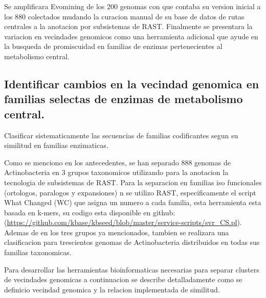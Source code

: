 \documentclass[12pt,twoside]{reedthesis}
\begin{document}
  Se amplificara Evomining de los 200 genomas con que contaba su version
  inicial a los 880 colectados mudando la curacion manual de su base de
  datos de rutas centrales a la anotacion por subsistemas de RAST.
  Finalmente se presentara la variacion en vecindades genomicos como una
  herramienta adicional que ayude en la busqueda de promiscuidad en
  familias de enzimas pertenecientes al metabolismo central.
  
  \subsection{Identificar cambios en la vecindad genomica en familias
  selectas de enzimas de metabolismo
  central.}\label{identificar-cambios-en-la-vecindad-genomica-en-familias-selectas-de-enzimas-de-metabolismo-central.-1}
  
  Clasificar sistematicamente las secuencias de familias codificantes
  segun su similitud en familias enzimaticas.
  
  Como se menciono en los antecedentes, se han separado 888 genomas de
  Actinobacteria en 3 grupos taxonomicos utilizando para la anotacion la
  tecnologia de subsistemas de RAST. Para la separacion en familias iso
  funcionales (ortologos, paralogos y expansiones) n se utilizo RAST,
  especificamente el script What Changed (WC) que asigna un numero a cada
  familia, esta herramienta esta basada en k-mers, su codigo esta
  disponible en github:
  (\url{https://github.com/kbase/kbseed/blob/master/service-scripts/svr_CS.pl}).
  Ademas de en los tres grupos ya mencionados, tambien se realizara una
  clasificacion para trescientos genomas de Actinobacteria distribuidos en
  todas sus familias taxonomicas.
  
  Para desarrollar las herramientas bioinformaticas necesarias para
  separar clusters de vecindades genomicas a continuacion se describe
  detalladamente como se definicio vecindad genomica y la relacion
  implementada de similitud.
  
\end{document}
